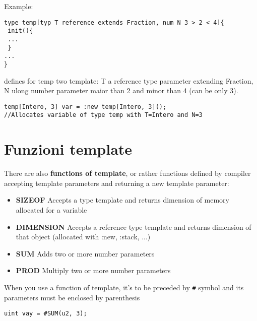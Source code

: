 \documentclass[10pt]{book}%
\renewcommand{\emph}[1]{\textbf{#1}}
\newenvironment{codeenv}{
\begin{mdframed}[backgroundcolor=black!20,topline=false,leftline=false,rightline=false,bottomline=false]
}
{\end{mdframed}}
\begin{document}
Example:
\begin{codeenv}
\begin{verbatim}
type temp[typ T reference extends Fraction, num N 3 > 2 < 4]{
 init(){
 ...
 }
...
}
\end{verbatim}
\end{codeenv}
defines for temp two template: T a reference type parameter extending Fraction, N ulong number parameter maior than 2 and minor than 4 (can be only 3).

\begin{codeenv}
\begin{verbatim}
temp[Intero, 3] var = :new temp[Intero, 3]();
//Allocates variable of type temp with T=Intero and N=3
\end{verbatim}
\end{codeenv}

\section{Funzioni template}
There are also \emph{functions of template}, or rather functions defined by compiler accepting template parameters and returning a new template parameter:
\begin{itemize}
\item \emph{SIZEOF} Accepts a type template and returns dimension of memory allocated for a variable
\item \emph{DIMENSION} Accepts a reference type template and returns dimension of that object (allocated with :new, :stack, ...)
\item \emph{SUM} Adds two or more number parameters
\item \emph{PROD} Multiply two or more number parameters
\end{itemize}

When you use a function of template, it's to be preceded by \verb&#& symbol and its parameters must be enclosed by parenthesis
\begin{codeenv}
\begin{verbatim}
uint vay = #SUM(u2, 3);
\end{verbatim}
\end{codeenv}

\appendix
\end{document}
